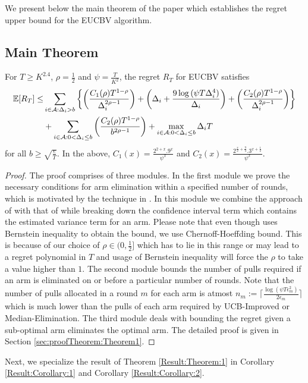 

We present below the main theorem of the paper which establishes the regret upper bound for the EUCBV  algorithm. 
\subsection{Main Theorem}
\begin{theorem}
\label{Result:Theorem:1}
For $T\geq K^{2.4}$, $\rho=\frac{1}{2}$ and $\psi=\frac{T}{K^2}$, the regret $R_T$ for EUCBV satisfies
\begin{align*}
 \mathbb{E} [R_{T}] \leq &\sum\limits_{i\in \mathcal{A} :\Delta_{i} > b}\bigg\lbrace\bigg(\dfrac{C_{1}(\rho)T^{1-\rho}}{\Delta_{i}^{2\rho -1}}\bigg) + \bigg(\Delta_{i}+\dfrac{9\log{(\psi  T\Delta_{i}^{4})}}{\Delta_{i}}\bigg) + \bigg(\dfrac{ C_{2}(\rho) T^{1-\rho}}{\Delta_{i}^{2\rho-1}} \bigg)\bigg \rbrace \\ 
  & +\sum\limits_{i\in \mathcal{A} :0 < \Delta_{i}\leq b}\bigg(\dfrac{C_{2}(\rho)T^{1-\rho}}{b^{2\rho -1}} \bigg) + \max_{i\in \mathcal{A} :0 < \Delta_{i}\leq b}\Delta_{i}T
\end{align*}
for all $b\geq\sqrt{\frac{e}{T}}$. In the above, $C_1(x) = \frac{2^{2+x}.9^{x}}{\psi^{x}}$ and $C_2(x) = \frac{2^{\frac{x}{2}+\frac{9}{4}}.3^{x+\frac{1}{2}}}{\psi^{x}}$.
\end{theorem}

\begin{proof}
The proof comprises of three modules. In the first module we prove the necessary conditions for arm elimination within a specified number of rounds, which is motivated by the technique in \cite{auer2010ucb}. In this module we combine the approach of \citet{audibert2009exploration} with that of  \citet{auer2010ucb} while breaking down the confidence interval term which contains the estimated variance   term for an arm. Please note that even though \citet{audibert2009exploration} uses Bernstein inequality to obtain the  bound, we use Chernoff-Hoeffding bound. This is because of our choice of $\rho\in (0,\frac{1}{2}]$ which has to lie in this range or may lead to a regret polynomial in $T$ and usage of Bernstein inequality will force the $\rho$ to take a value higher than $1$. The second module bounds the number of pulls required if an arm is eliminated on or before a particular number of rounds. Note that the number of pulls allocated in a round $m$ for each arm is atmost $n_{m}:=\bigg\lceil\frac{\log{(\psi T\epsilon_{m}^{2})}}{2\epsilon_{m}}\bigg\rceil$ which is much lower than the pulls of each arm required by UCB-Improved or Median-Elimination. The third module deals with bounding the regret given a sub-optimal arm eliminates the optimal arm. The detailed proof is given in Section \ref{sec:proofTheorem:Theorem1}.
\end{proof}
Next, we specialize the result of Theorem \ref{Result:Theorem:1} in Corollary \ref{Result:Corollary:1} and Corollary \ref{Result:Corollary:2}.

